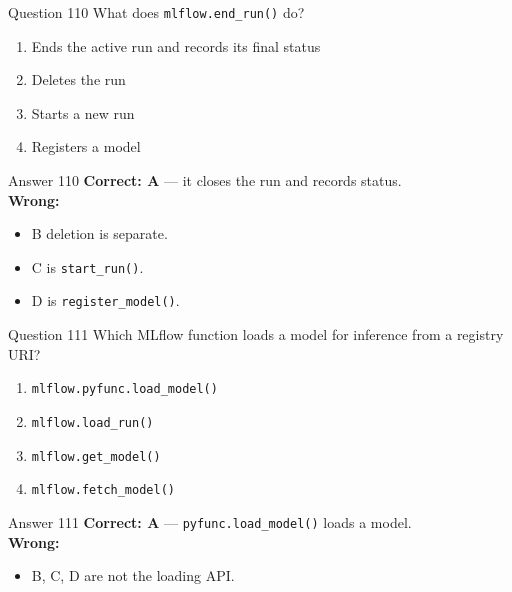\documentclass[aspectratio=169,11pt]{beamer}
\begin{document}
	\begin{frame}{Question 110}
		What does \texttt{mlflow.end\_run()} do?
		\begin{enumerate}[label=\Alph*.]
			\item Ends the active run and records its final status
			\item Deletes the run
			\item Starts a new run
			\item Registers a model
		\end{enumerate}
	\end{frame}
	\begin{frame}{Answer 110}
		\textbf{Correct: A} --- it closes the run and records status.\\
		\vspace{0.5em}
		\textbf{Wrong:}
		\begin{itemize}
			\item B deletion is separate.
			\item C is \texttt{start\_run()}.
			\item D is \texttt{register\_model()}.
		\end{itemize}
	\end{frame}
	
	\begin{frame}{Question 111}
		Which MLflow function loads a model for inference from a registry URI?
		\begin{enumerate}[label=\Alph*.]
			\item \texttt{mlflow.pyfunc.load\_model()}
			\item \texttt{mlflow.load\_run()}
			\item \texttt{mlflow.get\_model()}
			\item \texttt{mlflow.fetch\_model()}
		\end{enumerate}
	\end{frame}
	\begin{frame}{Answer 111}
		\textbf{Correct: A} --- \texttt{pyfunc.load\_model()} loads a model.\\
		\vspace{0.5em}
		\textbf{Wrong:}
		\begin{itemize}
			\item B, C, D are not the loading API.
		\end{itemize}
	\end{frame}
	
\end{document}
